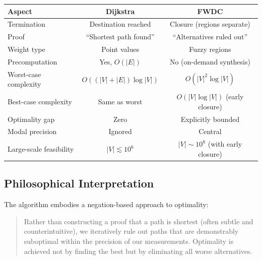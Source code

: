 \documentclass[twocolumn,11pt,a4paper]{article}
\theoremstyle{definition}
\begin{document}
\begin{center}
\begin{tabular}{lcc}
\toprule
Aspect & Dijkstra & FWDC \\
\midrule
Termination & Destination reached & Closure (regions separate) \\
Proof & ``Shortest path found'' & ``Alternatives ruled out'' \\
Weight type & Point values & Fuzzy regions \\
Precomputation & Yes, $O(|E|)$ & No (on-demand synthesis) \\
Worst-case complexity & $O((|V| + |E|) \log |V|)$ & $O(|V|^2 \log |V|)$ \\
Best-case complexity & Same as worst & $O(|V| \log |V|)$ (early closure) \\
Optimality gap & Zero & Explicitly bounded \\
Modal precision & Ignored & Central \\
Large-scale feasibility & $|V| \lesssim 10^6$ & $|V| \sim 10^8$ (with early closure) \\
\bottomrule
\end{tabular}
\end{center}

\subsection{Philosophical Interpretation}

The algorithm embodies a negation-based approach to optimality:

\begin{quote}
Rather than constructing a proof that a path is shortest (often subtle and counterintuitive), we iteratively rule out paths that are demonstrably suboptimal within the precision of our measurements. Optimality is achieved not by finding the best but by eliminating all worse alternatives.
\end{quote}
\end{document}
